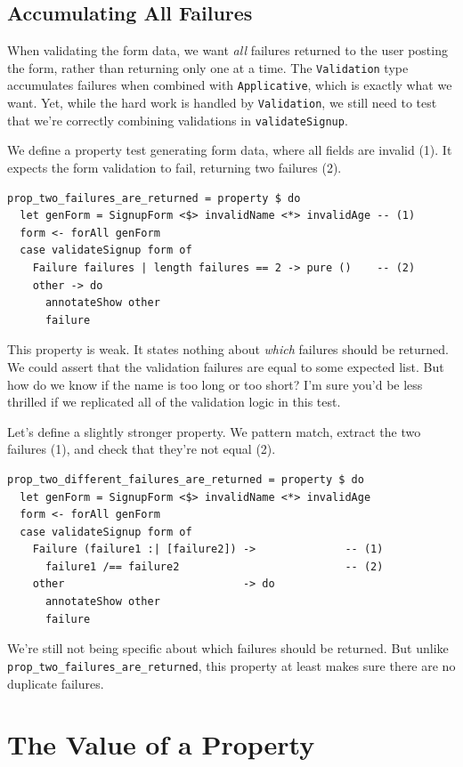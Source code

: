 \subsection{Accumulating All
Failures}
\label{accumulating-all-failures}

When validating the form data, we want \emph{all} failures returned to
the user posting the form, rather than returning only one at a time. The
\texttt{Validation} type accumulates failures when combined with
\texttt{Applicative}, which is exactly what we want. Yet, while the hard
work is handled by \texttt{Validation}, we still need to test that we're
correctly combining validations in \texttt{validateSignup}.

We define a property test generating form data, where all fields are
invalid (1). It expects the form validation to fail, returning two
failures (2).

\begin{verbatim}
prop_two_failures_are_returned = property $ do
  let genForm = SignupForm <$> invalidName <*> invalidAge -- (1)
  form <- forAll genForm
  case validateSignup form of
    Failure failures | length failures == 2 -> pure ()    -- (2)
    other -> do
      annotateShow other
      failure
\end{verbatim}
This property is weak. It states nothing about \emph{which} failures
should be returned. We could assert that the validation failures are
equal to some expected list. But how do we know if the name is too long
or too short? I'm sure you'd be less thrilled if we replicated all of
the validation logic in this test.

Let's define a slightly stronger property. We pattern match, extract the
two failures (1), and check that they're not equal (2).

\begin{verbatim}
prop_two_different_failures_are_returned = property $ do
  let genForm = SignupForm <$> invalidName <*> invalidAge
  form <- forAll genForm
  case validateSignup form of
    Failure (failure1 :| [failure2]) ->              -- (1)
      failure1 /== failure2                          -- (2)
    other                            -> do
      annotateShow other
      failure
\end{verbatim}
We're still not being specific about which failures should be returned.
But unlike \texttt{prop\_two\_failures\_\-are\_\-returned}, this property at
least makes sure there are no duplicate failures.

\section{The Value of a Property}
\label{the-value-of-a-property}


